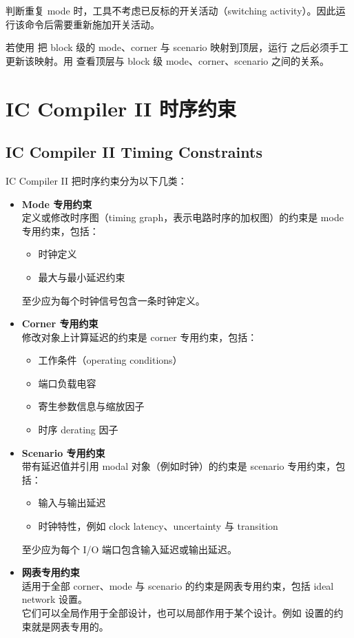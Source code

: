 判断重复 mode 时，工具不考虑已反标的开关活动（switching activity）。因此运行该命令后需要重新施加开关活动。

若使用  把 block 级的 mode、corner 与 scenario 映射到顶层，运行  之后必须手工更新该映射。用  查看顶层与 block 级 mode、corner、scenario 之间的关系。

\section{IC Compiler II 时序约束}
\subsection*{IC Compiler II Timing Constraints}

IC Compiler II 把时序约束分为以下几类：
\begin{itemize}
  \item \textbf{Mode 专用约束}\\
        定义或修改时序图（timing graph，表示电路时序的加权图）的约束是 mode 专用约束，包括：
  \begin{itemize}
    \item 时钟定义
    \item 最大与最小延迟约束
  \end{itemize}
        至少应为每个时钟信号包含一条时钟定义。
  \item \textbf{Corner 专用约束}\\
        修改对象上计算延迟的约束是 corner 专用约束，包括：
  \begin{itemize}
    \item 工作条件（operating conditions）
    \item 端口负载电容
    \item 寄生参数信息与缩放因子
    \item 时序 derating 因子
  \end{itemize}
  \item \textbf{Scenario 专用约束}\\
        带有延迟值并引用 modal 对象（例如时钟）的约束是 scenario 专用约束，包括：
  \begin{itemize}
    \item 输入与输出延迟
    \item 时钟特性，例如 clock latency、uncertainty 与 transition
  \end{itemize}
        至少应为每个 I/O 端口包含输入延迟或输出延迟。
  \item \textbf{网表专用约束}\\
        适用于全部 corner、mode 与 scenario 的约束是网表专用约束，包括 ideal network 设置。\\
        它们可以全局作用于全部设计，也可以局部作用于某个设计。例如  设置的约束就是网表专用的。
\end{itemize}

